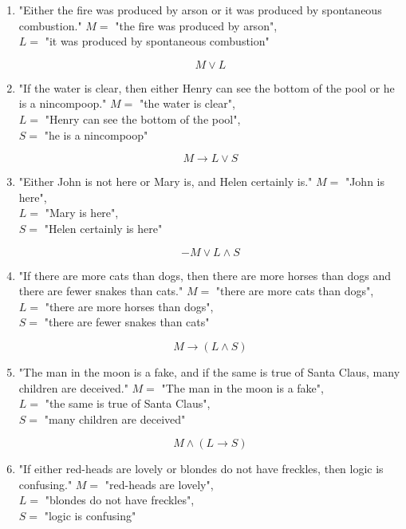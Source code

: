 \documentclass{article}
\begin{document}
\begin{enumerate}[label=(\alph*)]
    \item "Either the fire was produced by arson or it was produced by spontaneous combustion."
\singlespace
    \(M =\) "the fire was produced by arson",\\
    \(L = \) "it was produced by spontaneous combustion"
\singlespace

\[M \lor L\]

    \item "If the water is clear, then either Henry can see the bottom of the pool or he is a nincompoop."
\singlespace
    \(M =\) "the water is clear",\\
    \(L = \) "Henry can see the bottom of the pool",\\
    \(S = \) "he is a nincompoop"
\singlespace

\[M \rightarrow L \lor S\]

    \item "Either John is not here or Mary is, and Helen certainly is."
\singlespace
    \(M =\) "John is here",\\
    \(L = \) "Mary is here",\\
    \(S = \) "Helen certainly is here"
\singlespace

\[-M \lor L \land S\]

    \item "If there are more cats than dogs, then there are more horses than dogs and there are fewer snakes than cats."
\singlespace
    \(M =\) "there are more cats than dogs",\\
    \(L = \) "there are more horses than dogs",\\
    \(S = \) "there are fewer snakes than cats"
\singlespace

\[M \rightarrow (L \land S)\]

    \item "The man in the moon is a fake, and if the same is true of Santa Claus, many children are deceived."
\singlespace
    \(M =\) "The man in the moon is a fake",\\
    \(L = \) "the same is true of Santa Claus",\\
    \(S = \) "many children are deceived"
\singlespace

\[M \land (L \rightarrow S)\]

    \item "If either red-heads are lovely or blondes do not have freckles, then logic is confusing."
\singlespace
    \(M =\) "red-heads are lovely",\\
    \(L = \) "blondes do not have freckles",\\
    \(S = \) "logic is confusing"
\singlespace


\end{enumerate}
\end{document}
